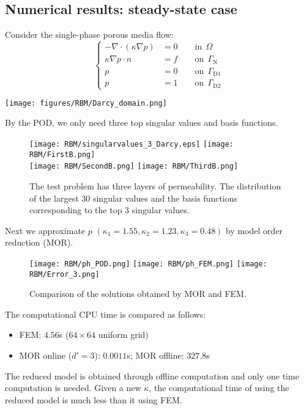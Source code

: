 \subsection{Numerical results: steady-state case}
Consider the single-phase porous media flow:
\begin{equation}
\left\{
\begin{aligned}
- \nabla \cdot (\kappa \nabla p) & = 0  \qquad \text{in}~~ \Omega \\
\kappa \nabla p \cdot n &= f \qquad \text{on} ~~ \Gamma_\text{N} \\
p  &= 0 \qquad \text{on} ~~\Gamma_{\text{D}1} \\
p  &= 1 \qquad \text{on}~~ \Gamma_{\text{D}2} 
\end{aligned}
\right. 
\end{equation}
\begin{center}
\texttt{[image: figures/RBM/Darcy\_domain.png]}
\end{center}
By the POD, we only need three top singular values and basis functions.
	\begin{figure}[!htbp]
	\centering 
	\texttt{[image: RBM/singularvalues\_3\_Darcy.eps]}
	\texttt{[image: RBM/FirstB.png]}\\
	\texttt{[image: RBM/SecondB.png]}
	\texttt{[image: RBM/ThirdB.png]}
	\caption{The test problem has three layers of permeability. The distribution of the largest 30 singular values and the basis functions corresponding to the top 3 singular values.}
\end{figure}

Next we approximate $p$ $(\kappa_1=1.55,\kappa_2=1.23,\kappa_3=0.48)$ by model order reduction (MOR).
\begin{figure}[!htbp]
	\centering
	\texttt{[image: RBM/ph\_POD.png]}
	\texttt{[image: RBM/ph\_FEM.png]}
	\texttt{[image: RBM/Error\_3.png]}
	\caption{Comparison of the solutions obtained by MOR and FEM.}
\end{figure}
The computational CPU time is compared as follows: 
\begin{itemize}
	\item FEM: $4.56$s ($64 \times 64$ uniform grid)
	\item MOR online ($d'=3$): $0.0011$s; MOR offline: $327.8$s
\end{itemize}
The reduced model is obtained through offline computation and only one time computation is needed. Given a new $\kappa$, the computational time of using the reduced model is much less than it using FEM.

